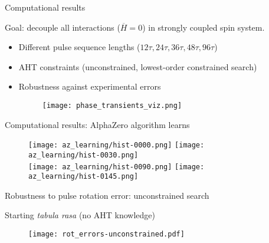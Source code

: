 \documentclass{beamer}
\begin{document}
\begin{frame}{Computational results}


Goal: decouple all interactions (\(\overline{H}=0\)) in strongly coupled spin system.
\begin{itemize}
    \item Different pulse sequence lengths ($12\tau, 24\tau, 36\tau, 48\tau, 96\tau$)
    \item AHT constraints (unconstrained, lowest-order constrained search)
    \item Robustness against experimental errors
    
    \begin{figure}
        \centering
        \scalebox{.5}{
        
        }
        \hspace{1em}
        \texttt{[image: phase\_transients\_viz.png]}
    \end{figure}
\end{itemize}


\end{frame}

\begin{frame}{Computational results: AlphaZero algorithm learns}

\begin{figure}
\centering
\texttt{[image: az\_learning/hist-0000.png]}
\texttt{[image: az\_learning/hist-0030.png]} \\
\texttt{[image: az\_learning/hist-0090.png]}
\texttt{[image: az\_learning/hist-0145.png]}
\end{figure}


\end{frame}

\begin{frame}
{Robustness to pulse rotation error: unconstrained search}

Starting \emph{tabula rasa} (no AHT knowledge)


\begin{figure}
\centering
\texttt{[image: rot\_errors-unconstrained.pdf]}
\end{figure}



\end{frame}
\end{document}
